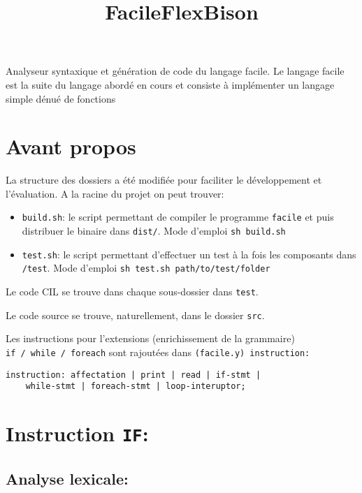 \documentclass[11pt]{article}
\title{FacileFlexBison}
\begin{document}
    
    
    \maketitle
    
    

    
    Analyseur syntaxique et génération de code du langage facile. Le langage
facile est la suite du langage abordé en cours et consiste à implémenter
un langage simple dénué de fonctions

\hypertarget{avant-propos}{%
\section{Avant propos}\label{avant-propos}}

La structure des dossiers a été modifiée pour faciliter le développement
et l'évaluation. A la racine du projet on peut trouver:

\begin{itemize}
\item
  \texttt{build.sh}: le script permettant de compiler le programme
  \texttt{facile} et puis distribuer le binaire dans \texttt{dist/}.
  Mode d'emploi \texttt{sh\ build.sh}
\item
  \texttt{test.sh}: le script permettant d'effectuer un test à la fois
  les composants dans \texttt{/test}. Mode d'emploi
  \texttt{sh\ test.sh\ path/to/test/folder}
\end{itemize}

Le code CIL se trouve dans chaque sous-dossier dans \texttt{test}.

Le code source se trouve, naturellement, dans le dossier \texttt{src}.

Les instructions pour l'extensions (enrichissement de la grammaire)
\texttt{if\ /\ while\ /\ foreach} sont rajoutées dans
\texttt{(facile.y)\ instruction:}

\begin{verbatim}
instruction: affectation | print | read | if-stmt | 
    while-stmt | foreach-stmt | loop-interuptor;
\end{verbatim}

    \hypertarget{instruction-if}{%
\section{\texorpdfstring{Instruction
\texttt{IF}:}{Instruction IF:}}\label{instruction-if}}

    \hypertarget{analyse-lexicale}{%
\subsection{Analyse lexicale:}\label{analyse-lexicale}}
\end{document}
